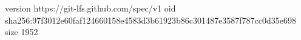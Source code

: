 version https://git-lfs.github.com/spec/v1
oid sha256:97f3012e60faf124660158e4583d3b61923b86c301487e3587f787cc0d35e698
size 1952
